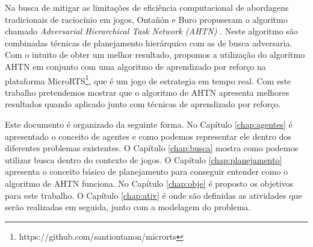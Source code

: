 Na busca de mitigar as limitações de eficiência computacional de abordagens tradicionais de raciocínio em jogos, Ontañón e Buro propuseram o algoritmo chamado \textit{Adversarial Hierarchical Task Network (AHTN)} \cite{ontanon2015adversarial}. Neste algoritmo são combinadas técnicas de planejamento hierárquico com as de busca adversaria. Com o intuito de obter um melhor resultado, propomos a utilização do algoritmo AHTN em conjunto com uma algoritmo de aprendizado por reforço na plataforma MicroRTS\footnote{https://github.com/santiontanon/microrts}, que é um jogo de estrategia em tempo real. Com este trabalho pretendemos mostrar que o algoritmo de AHTN apresenta melhores resultados quando aplicado junto com técnicas de aprendizado por reforço. 

Este documento é organizado da seguinte forma. No Capítulo \ref{chap:agentes} é apresentado o conceito de agentes e como podemos representar ele dentro dos diferentes problemas existentes. O Capítulo \ref{chap:busca} mostra como podemos utilizar busca dentro do contexto de jogos. O Capítulo \ref{chap:planejamento} apresenta o conceito básico de planejamento para conseguir entender como o algoritmo de AHTN funciona. No Capítulo \ref{chap:obje} é proposto os objetivos para este trabalho. O Capítulo \ref{chap:ativ} é onde são definidas as atividades que serão realizadas em seguida, junto com a modelagem do problema.   
